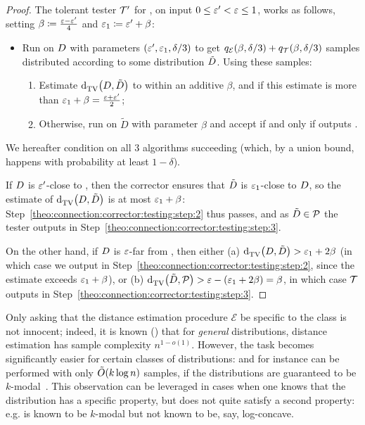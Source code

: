 \begin{proof}
The tolerant tester $\mathcal{T}^\prime$ for \property, on input $0 \leq \varepsilon^\prime < \varepsilon \leq 1$, works as follows, setting $\beta\coloneqq\frac{\varepsilon-\varepsilon^\prime}{4}$ and $\varepsilon_1\coloneqq \varepsilon^\prime+\beta$:
\begin{itemize}[-]
  \item\label{theo:connection:corrector:testing:step:1} Run \Algo on $D$ with parameters $(\varepsilon^\prime,\varepsilon_1,\delta/3)$ to get $q_{\mathcal{E}}(\beta,\delta/3)+q_\mathcal{T}(\beta,\delta/3)$ samples distributed according to some distribution $\tilde{D}$. Using these samples:
    \begin{enumerate}
        \item\label{theo:connection:corrector:testing:step:2} Estimate ${\operatorname{d}_{\textrm{TV}}^{}\!\left({D, \tilde{D}}\right)}$ to within an additive $\beta$, and \reject if this estimate is more than $\varepsilon_1+\beta=\frac{\varepsilon+\varepsilon^\prime}{2}$;
        \item\label{theo:connection:corrector:testing:step:3} Otherwise, run \Tester on $\tilde{D}$ with parameter $\beta$ and accept if and only if \Tester outputs \accept.
    \end{enumerate}
\end{itemize}

We hereafter condition on all 3 algorithms succeeding (which, by a union bound, happens with probability at least $1-\delta$).

\noindent If $D$ is $\varepsilon^\prime$-close to \property, then the corrector ensures that $\tilde{D}$ is $\varepsilon_1$-close to $D$, so the estimate of ${\operatorname{d}_{\textrm{TV}}^{}\!\left({D, \tilde{D}}\right)}$ is at most $\varepsilon_1+\beta$: Step~\ref{theo:connection:corrector:testing:step:2} thus passes, and as $\tilde{D}\in\mathcal{P}$ the tester outputs \accept in Step~\ref{theo:connection:corrector:testing:step:3}.\medskip

\noindent On the other hand, if $D$ is $\varepsilon$-far from \property, then either \textsf{(a)} ${\operatorname{d}_{\textrm{TV}}^{}\!\left({D, \tilde{D}}\right)} > \varepsilon_1+2\beta$ (in which case we output \reject in Step~\ref{theo:connection:corrector:testing:step:2}, since the estimate exceeds $\varepsilon_1+\beta$), or \textsf{(b)} ${\operatorname{d}_{\textrm{TV}}^{}\!\left({\tilde{D}, \mathcal{P}}\right)} > \varepsilon - (\varepsilon_1+2\beta) = \beta$, in which case $\mathcal{T}$ outputs \reject in Step~\ref{theo:connection:corrector:testing:step:3}.
\end{proof}

\begin{remark}\label{remark:distance:estimation}
Only asking that the distance estimation procedure $\mathcal{E}$ be specific to the class \class is not innocent; indeed, it is known (\cite{VV:11:stoc}) that for \emph{general} distributions, distance estimation has sample complexity $n^{1-o(1)}$. However, the task becomes significantly easier for certain classes of distributions: and for instance can be performed with only $\tildeO{k\log n}$ samples, if the distributions are guaranteed to be $k$-modal~\cite{DDSVV:13}. This observation can be leveraged in cases
when one knows that the distribution has a specific property, but does not quite satisfy a second property: e.g. is known to be $k$-modal but not known to be, say, log-concave.
\end{remark}

